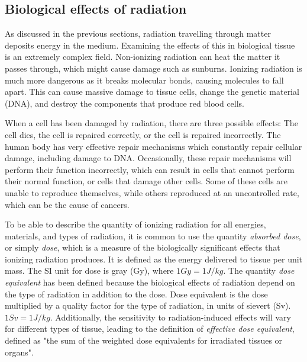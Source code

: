 \documentclass[../main/thesis.tex]{subfiles}
\begin{document}
\subsection{Biological effects of radiation}
\label{t-bio}
As discussed in the previous sections, radiation travelling through matter deposits energy in the medium. Examining the effects of this in biological tissue is an extremely complex field. Non-ionizing radiation can heat the matter it passes through, which might cause damage such as sunburns. Ionizing radiation is much more dangerous as it breaks molecular bonds, causing molecules to fall apart. This can cause massive damage to tissue cells, change the genetic material (DNA), and destroy the components that produce red blood cells. \citep[chap. 43]{UniversityPhysics} 

When a cell has been damaged by radiation, there are three possible effects: The cell dies, the cell is repaired correctly, or the cell is repaired incorrectly. The human body has very effective repair mechanisms which constantly repair cellular damage, including damage to DNA. Occasionally, these repair mechanisms will perform their function incorrectly, which can result in cells that cannot perform their normal function, or cells that damage other cells. Some of these cells are unable to reproduce themselves, while others reproduced at an uncontrolled rate, which can be the cause of cancers.\citetext{\citeauthor{jlab}}

To be able to describe the quantity of ionizing radiation for all energies, materials, and types of radiation, it is common to use the quantity \textit{absorbed dose}, or simply \textit{dose}, which is a measure of the biologically significant effects that ionizing radiation produces. It is defined as the energy delivered to tissue per unit mass. The SI unit for dose is gray (Gy), where $1 Gy = 1 J/kg$. \citep[chap. 8]{Khan} The quantity \textit{dose equivalent} has been defined because the biological effects of radiation depend on the type of radiation in addition to the dose. Dose equivalent is the dose multiplied by a quality factor for the type of radiation, in units of sievert (Sv). $1 Sv = 1 J/kg$. Additionally, the sensitivity to radiation-induced effects will vary for different types of tissue, leading to the definition of \textit{effective dose equivalent}, defined as "the sum of the weighted dose equivalents for irradiated tissues or organs". \citep[chap. 16]{Khan} 

\end{document}
